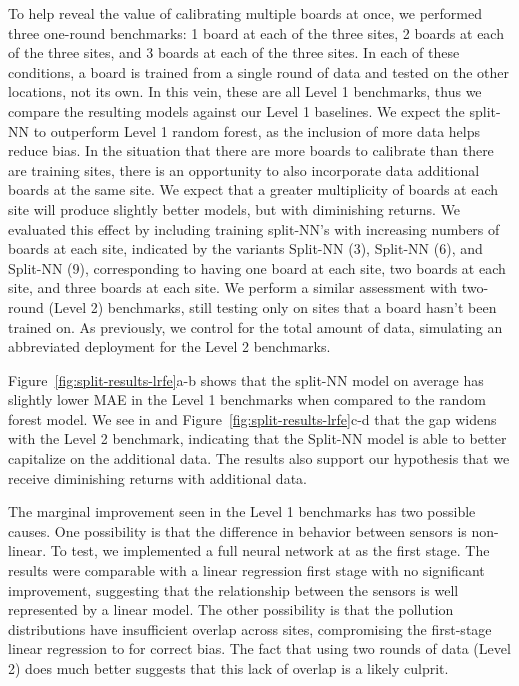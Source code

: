 \documentclass[journal abbreviation, manuscript]{copernicus}
\begin{document}
To help reveal the value of calibrating multiple boards at once, we performed three one-round benchmarks: 1 board at each of the three sites, 2 boards at each of the three sites, and 3 boards at each of the three sites.  In each of these conditions, a board is trained from a single round of data and tested on the other locations, not its own.  In this vein, these are all Level 1 benchmarks, thus we compare the resulting models against our Level 1 baselines. We expect the split-NN to outperform Level 1 random forest, as the inclusion of more data helps reduce bias. In the situation that there are more boards to calibrate than there are training sites, there is an opportunity to also incorporate data additional boards at the same site.  We expect that a greater multiplicity of boards at each site will produce slightly better models, but with diminishing returns. We evaluated this effect by including training split-NN's with increasing numbers of boards at each site, indicated by the variants Split-NN (3), Split-NN (6), and Split-NN (9), corresponding to having one board at each site, two boards at each site, and three boards at each site.  We perform a similar assessment with two-round (Level 2) benchmarks, still testing only on sites that a board hasn't been trained on.  As previously, we control for the total amount of data, simulating an abbreviated deployment for the Level 2 benchmarks.

Figure~\ref{fig:split-results-lrfe}a-b shows that the split-NN model on average has slightly lower MAE in the Level 1 benchmarks when compared to the random forest model. We see in and Figure~\ref{fig:split-results-lrfe}c-d that the gap widens with the Level 2 benchmark, indicating that the Split-NN model is able to better capitalize on the additional data. The results also support our hypothesis that we receive diminishing returns with additional data. 

The marginal improvement seen in the Level 1 benchmarks has two possible causes.  One possibility is that the difference in behavior between sensors is non-linear. To test, we implemented a full neural network at as the first stage. The results were comparable with a linear regression first stage with no significant improvement, suggesting that the relationship between the sensors is well represented by a linear model. The other possibility is that the pollution distributions have insufficient overlap across sites, compromising the first-stage linear regression to for correct bias. The fact that using two rounds of data (Level 2) does much better suggests that this lack of overlap is a likely culprit. 
\end{document}

